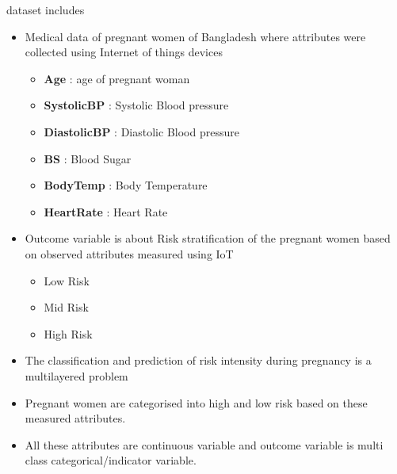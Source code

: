 \documentclass[12pt, letter]{article}
\begin{document}
dataset includes 
\begin{itemize}
    \item Medical data of pregnant women of Bangladesh where attributes were collected using Internet of things devices \\
    \begin{itemize}
        \item \textbf{Age} : age of pregnant woman
        \item \textbf{SystolicBP} : Systolic Blood pressure 
        \item \textbf{DiastolicBP} : Diastolic Blood pressure
        \item \textbf{BS} : Blood Sugar	
        \item \textbf{BodyTemp} : Body Temperature 
        \item \textbf{HeartRate} : Heart Rate
    \end{itemize}
    
    \item Outcome variable is about Risk stratification of the pregnant women based on observed attributes measured using IoT 
    \begin{itemize}
        \item Low Risk
        \item Mid Risk
        \item High Risk
    \end{itemize}

\pagebreak
    
    \item The classification and prediction of risk intensity during pregnancy is a multilayered problem
    
    \item Pregnant women are categorised into high and low risk based on these measured attributes.
    
    \item All these attributes are continuous variable and outcome variable is multi class categorical/indicator variable.
\end{itemize}
\end{document}
